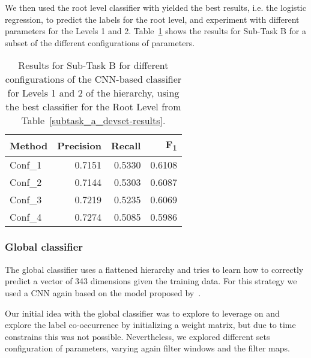 \documentclass[11pt,a4paper]{article}
\begin{document}
We then used the root level classifier with yielded the best results, i.e. the
logistic regression, to predict the labels for the root level, and experiment
with different parameters for the Levels 1 and 2. Table~\ref{level-1-2} shows
the results for Sub-Task B for a subset of the different configurations of parameters.

\begin{table}[!h]
\begin{center}
\begin{tabular}{|l|r|r|r|}
\hline\centering\textbf{Method}  & \textbf{Precision} &  \textbf{Recall} &  \textbf{F\textsubscript{1}}\\
\hline
 Conf\_1 & 0.7151 & 0.5330 & 0.6108 \\
 Conf\_2 & 0.7144 & 0.5303 & 0.6087 \\
 Conf\_3 & 0.7219 & 0.5235 & 0.6069 \\
 Conf\_4 & 0.7274 & 0.5085 & 0.5986 \\
\hline
\end{tabular}
\end{center}
\caption{\label{level-1-2} Results for Sub-Task B for different configurations
of the CNN-based classifier for Levels 1 and 2 of the hierarchy, using the best
classifier for the Root Level from Table~\ref{subtask_a_devset-results}.}
\end{table}






\subsubsection{Global classifier}

The global classifier uses a flattened hierarchy and tries to learn how to correctly
predict a vector of 343 dimensions given the training data. For this strategy we
used a CNN again based on the model proposed by~.

Our initial idea with the global classifier was to explore to leverage on and
explore the label co-occurrence by initializing a weight matrix, but due to
time constrains this was not possible. Nevertheless, we explored different sets
configuration of parameters, varying again filter windows and the filter maps.
\end{document}

